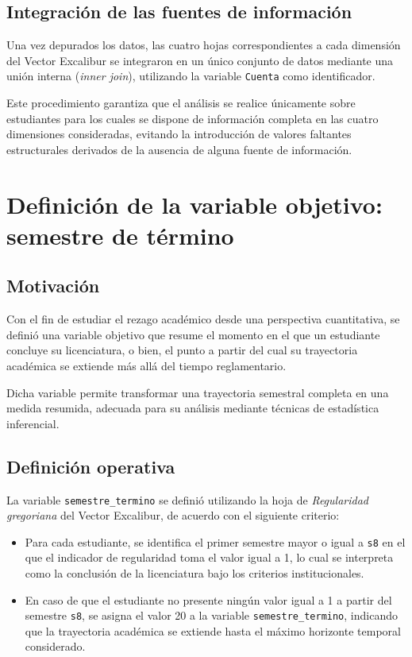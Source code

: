 \subsection{Integración de las fuentes de información}

Una vez depurados los datos, las cuatro hojas correspondientes a cada dimensión del Vector
Excalibur se integraron en un único conjunto de datos mediante una unión interna
(\textit{inner join}), utilizando la variable \texttt{Cuenta} como identificador.

Este procedimiento garantiza que el análisis se realice únicamente sobre estudiantes para los
cuales se dispone de información completa en las cuatro dimensiones consideradas, evitando la
introducción de valores faltantes estructurales derivados de la ausencia de alguna fuente de
información.

\section{Definición de la variable objetivo: semestre de término}

\subsection{Motivación}

Con el fin de estudiar el rezago académico desde una perspectiva cuantitativa, se definió una
variable objetivo que resume el momento en el que un estudiante concluye su licenciatura, o bien,
el punto a partir del cual su trayectoria académica se extiende más allá del tiempo
reglamentario.

Dicha variable permite transformar una trayectoria semestral completa en una medida resumida,
adecuada para su análisis mediante técnicas de estadística inferencial.

\subsection{Definición operativa}

La variable \texttt{semestre\_termino} se definió utilizando la hoja de \textit{Regularidad
gregoriana} del Vector Excalibur, de acuerdo con el siguiente criterio:

\begin{itemize}
    \item Para cada estudiante, se identifica el primer semestre mayor o igual a \texttt{s8} en
    el que el indicador de regularidad toma el valor igual a 1, lo cual se interpreta como la
    conclusión de la licenciatura bajo los criterios institucionales.
    \item En caso de que el estudiante no presente ningún valor igual a 1 a partir del semestre
    \texttt{s8}, se asigna el valor 20 a la variable \texttt{semestre\_termino}, indicando que la
    trayectoria académica se extiende hasta el máximo horizonte temporal considerado.
\end{itemize}

